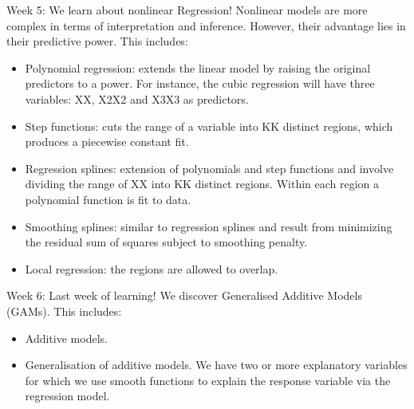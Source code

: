 \documentclass[11pt]{article}
\begin{document}
Week 5:
We learn about nonlinear Regression! Nonlinear models are more complex in terms of interpretation and inference. However, their advantage lies in their predictive power. This includes:
\begin{itemize}
    \item Polynomial regression: extends the linear model by raising the original predictors to a power. For instance, the cubic regression will have three variables: XX, X2X2 and X3X3 as predictors.
    \item Step functions: cuts the range of a variable into KK distinct regions, which produces a piecewise constant fit.
    \item Regression splines: extension of polynomials and step functions and involve dividing the range of XX into KK distinct regions. Within each region a polynomial function is fit to data.
    \item Smoothing splines: similar to regression splines and result from minimizing the residual sum of squares subject to smoothing penalty.
    \item Local regression: the regions are allowed to overlap.
\end{itemize}

Week 6:
Last week of learning!
We discover Generalised Additive Models (GAMs).
This includes:
\begin{itemize}
    \item Additive models.
    \item Generalisation of additive models. We have two or more explanatory variables for which we use smooth functions to explain the response variable via the regression model.
\end{itemize}
\end{document}
